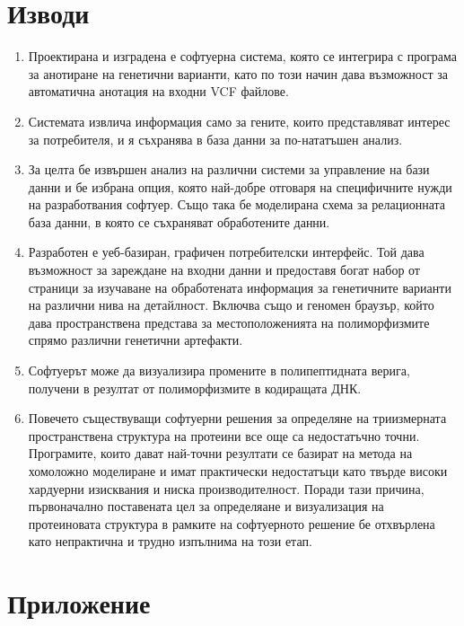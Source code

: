 \documentclass[pdftex,cyrillic,14pt,a4page,twoside,openright]{extreport}
\begin{document}
\chapter{Изводи}

\begin{enumerate}
	\item Проектирана и изградена е софтуерна система, която се интегрира с програма за анотиране на генетични варианти, като по този начин дава възможност за автоматична анотация на входни VCF файлове.
	\item Системата извлича информация само за гените, които представляват интерес за потребителя, и я съхранява в база данни за по-нататъшен анализ.
	\item За целта бе извършен анализ на различни системи за управление на бази данни и бе избрана опция, която най-добре отговаря на специфичните нужди на разработвания софтуер. Също така бе моделирана схема за релационната база данни, в която се съхраняват обработените данни.
	\item Разработен е уеб-базиран, графичен потребителски интерфейс. Той дава възможност за зареждане на входни данни и предоставя богат набор от страници за изучаване на обработената информация за генетичните варианти на различни нива на детайлност. Включва също и геномен браузър, който дава пространствена представа за местоположенията на полиморфизмите спрямо различни генетични артефакти.
	\item Софтуерът може да визуализира промените в полипептидната верига, получени в резултат от полиморфизмите в кодиращата ДНК.
	\item Повечето съществуващи софтуерни решения за определяне на триизмерната пространствена структура на протеини все още са недостатъчно точни. Програмите, които дават най-точни резултати се базират на метода на хомоложно моделиране и имат практически недостатъци като твърде високи хардуерни изисквания и ниска производителност. Поради тази причина, първоначално поставената цел за определяане и визуализация на протеиновата структура в рамките на софтуерното решение бе отхвърлена като непрактична и трудно изпълнима на този етап.
\end{enumerate}


\cleardoublepage
{}
{}




\cleardoublepage
\chapter*{Приложение}
{}
\end{document}
